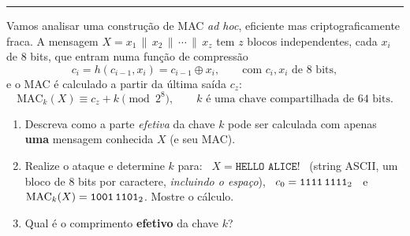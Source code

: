 \documentclass[11pt,a4paper]{article}
\newcommand{\exercicio}[1]{%
    \Needspace{8\baselineskip}%
    \par\vspace{1.2em}
    \noindent
    {\color{black!55}\rule[-0.25em]{3pt}{1.6em}}%
    \hspace{0.6em}{\Large\bfseries Exerc\'{i}cio #1}
    \par\vspace{-0.4em}
    \noindent{\color{black!35}\rule{\textwidth}{0.4pt}}
    \par\vspace{0.35em}
}
\begin{document}
\exercicio{6}
Vamos analisar uma constru\c{c}\~{a}o de MAC \emph{ad hoc}, eficiente mas criptograficamente fraca. A mensagem $X = x_1 \,\|\, x_2 \,\|\, \cdots \,\|\, x_z$ tem $z$ blocos independentes, cada $x_i$ de 8 bits, que entram numa fun\c{c}\~{a}o de compress\~{a}o
\[
    c_i = h(c_{i-1}, x_i) = c_{i-1} \oplus x_i, \qquad \text{com } c_i, x_i \text{ de 8 bits},
\]
e o MAC \'{e} calculado a partir da \'{u}ltima sa\'{i}da $c_z$:
\[
    \text{MAC}_k(X) \equiv c_z + k \pmod{2^8}, \qquad k \text{ \'{e} uma chave compartilhada de 64 bits.}
\]
\begin{enumerate}[label=(\alph*)]
    \item Descreva como a parte \emph{efetiva} da chave $k$ pode ser calculada com apenas \textbf{uma} mensagem conhecida $X$ (e seu MAC).
    \item Realize o ataque e determine $k$ para: \ $X = \texttt{HELLO ALICE!}$ \ (string ASCII, um bloco de 8 bits por caractere, \emph{incluindo o espa\c{c}o}), \ $c_0 = \texttt{1111\,1111}_2$ \ e \ $\text{MAC}_k(X) = \texttt{1001\,1101}_2$. Mostre o c\'{a}lculo.
    \item Qual \'{e} o comprimento \textbf{efetivo} da chave $k$?
\end{enumerate}
\end{document}
